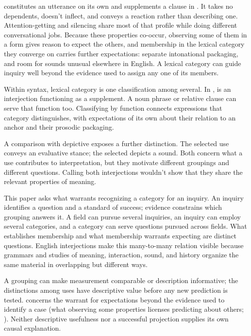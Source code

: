 \documentclass[12pt]{article}
\begin{document}
 constitutes an utterance on its own and supplements a
clause in . It takes no dependents, doesn't
inflect, and conveys a reaction rather than describing one.
Attention-getting  and silencing  share most of
that profile while doing different conversational jobs. Because these
properties co-occur, observing some of them in a form gives reason to
expect the others, and membership in the lexical category they converge on
carries further expectations: separate intonational packaging, and room for
sounds unusual elsewhere in English. A lexical category can guide inquiry
well beyond the evidence used to assign any one of its members.

Within syntax, lexical category is one classification among several. In
,  is an
interjection functioning as a supplement. A noun phrase or relative
clause can serve that function too. Classifying by function connects
expressions that category distinguishes, with expectations of its own
about their relation to an anchor and their prosodic packaging.

A comparison with depictive  exposes a further distinction.
The selected  use conveys an evaluative stance; the selected
 depicts a sound. Both concern what a use contributes to
interpretation, but they motivate different groupings and different
questions. Calling both interjections wouldn't show that they share the
relevant properties of meaning.

This paper asks what warrants recognizing a category for an inquiry.
An inquiry identifies a question and a standard of success; evidence
constrains which grouping answers it. A field can pursue several inquiries,
an inquiry can employ several categories, and a category can serve questions
pursued across fields. What establishes membership and what membership
warrants expecting are distinct questions. English interjections make this
many-to-many relation visible because grammars and studies of meaning,
interaction, sound, and history organize the same material in overlapping
but different ways.

A grouping can make measurement comparable or description informative;
the distinctions among  uses have descriptive value before
any new prediction is tested.  concerns the warrant
for expectations beyond the evidence used to identify a case (what
observing some properties licenses predicting about others;
\citealp{Goodman1955}). Neither descriptive usefulness nor a successful
projection supplies its own causal explanation.
\end{document}
